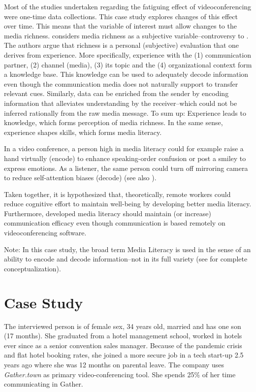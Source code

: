\documentclass[man]{apa7}
\begin{document}
Most of the studies undertaken regarding the fatiguing effect of videoconferencing were one-time data collections. This case study explores changes of this effect over time. This means that the variable of interest must allow changes to the media richness. \cite{Carlson1999} considers media richness as a subjective variable–controversy to \citeauthor{daft1983information}. The authors argue that richness is a personal (subjective) evaluation that one derives from experience. More specifically, experience with the (1) communication partner, (2) channel (media), (3) its topic and the (4) organizational context form a knowledge base. This knowledge can be used to adequately decode information even though the communication media does not naturally support to transfer relevant cues. Similarly, data can be enriched from the sender by encoding information that alleviates understanding by the receiver–which could not be inferred rationally from the raw media message. To sum up: Experience leads to knowledge, which forms perception of media richness. In the same sense, experience shapes skills, which forms media literacy.

In a video conference, a person high in media literacy could for example raise a hand virtually (encode) to enhance speaking-order confusion or post a smiley to express emotions. As a listener, the same person could turn off mirroring camera to reduce self-attention biases (decode) (see also \cite{Riedl2021}).

Taken together, it is hypothesized that, theoretically, remote workers could reduce cognitive effort to maintain well-being by developing better media literacy. Furthermore, developed media literacy should maintain (or increase) communication efficacy even though communication is based remotely on videoconferencing software.

Note: In this case study, the broad term Media Literacy is used in the sense of an ability to encode and decode information–not in its full variety (see \cite{Potter2010} for complete conceptualization).

\section{Case Study}

The interviewed person is of female sex, 34 years old, married and has one son (17 months). She graduated from a hotel management school, worked in hotels ever since as a senior convention sales manager. Because of the pandemic crisis and flat hotel booking rates, she joined a more secure job in a tech start-up 2.5 years ago where she was 12 months on parental leave. The company uses \textit{Gather.town} as primary video-conferencing tool. She spends 25\% of her time communicating in Gather.
\end{document}
